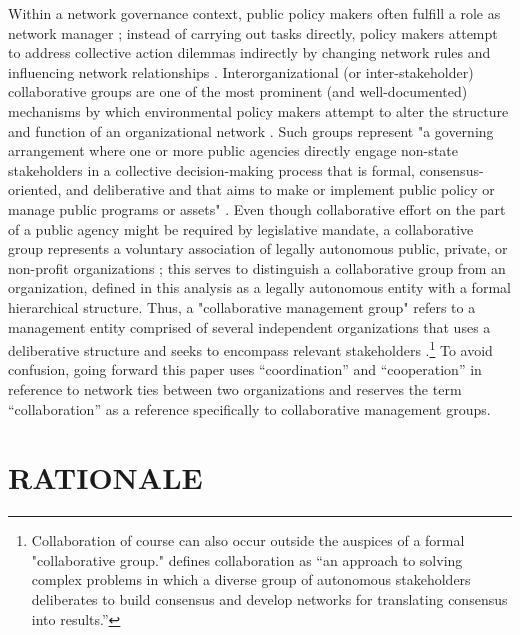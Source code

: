 \documentclass[12pt,a4paper,titlepage]{article}
\begin{document}
Within a network governance context, public policy makers often fulfill a role as network manager \parencite{klijn2000}; instead of carrying out tasks directly, policy makers attempt to address collective action dilemmas indirectly by changing network rules and influencing network relationships \parencite{klijn2006}. Interorganizational (or inter-stakeholder) collaborative groups are one of the most prominent (and well-documented) mechanisms by which environmental policy makers attempt to alter the structure and function of an organizational network \parencite[see][for recent discussions]{ansell2008,emerson2012,margerum2011}. Such groups represent "a governing arrangement where one or more public agencies directly engage non-state stakeholders in a collective decision-making process that is formal, consensus-oriented, and deliberative and that aims to make or implement public policy or manage public programs or assets" \parencite[544]{ansell2008} \parencite[see also][]{emerson2012,imperial2005,margerum2011}. Even though collaborative effort on the part of a public agency might be required by legislative mandate, a collaborative group represents a voluntary association of legally autonomous public, private, or non-profit organizations \parencite{ansell2008,schneider2003,lubell2002}; this serves to distinguish a collaborative group from an organization, defined in this analysis as a legally autonomous entity with a formal hierarchical structure. Thus, a "collaborative management group" refers to a management entity comprised of several independent organizations that uses a deliberative structure and seeks to encompass relevant stakeholders \parencite{ansell2008}.\footnote{Collaboration of course can also occur outside the auspices of a formal "collaborative group."  \textcite[p. 6]{margerum2011} defines collaboration as “an approach to solving complex problems in which a diverse group of autonomous stakeholders deliberates to build consensus and develop networks for translating consensus into results.”} To avoid confusion, going forward this paper uses ``coordination'' and ``cooperation'' in reference to network ties between two organizations and reserves the term ``collaboration'' as a reference specifically to collaborative management groups. 

\section{\bf\MakeUppercase{Rationale}}
\end{document}
